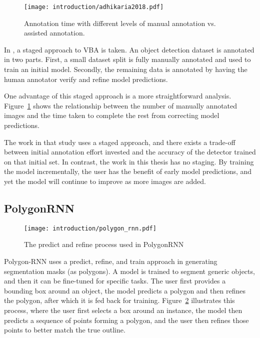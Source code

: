 \begin{figure}[h]
  \centering
  \texttt{[image: introduction/adhikaria2018.pdf]}
  \caption{Annotation time with different levels of manual annotation vs. assisted annotation. \cite{Adhikaria2018}}  
  \label{fig:adhikaria2018}
\end{figure}

In \cite{Adhikaria2018}, a staged approach to \gls{VBA} is taken. An object detection dataset is annotated in two parts. First, a small dataset split is fully manually annotated and used to train an initial model. Secondly, the remaining data is annotated by having the human annotator verify and refine model predictions. 

One advantage of this staged approach is a more straightforward analysis. Figure~\ref{fig:adhikaria2018} shows the relationship between the number of manually annotated images and the time taken to complete the rest from correcting model predictions.

The work in that study uses a staged approach, and there exists a trade-off between initial annotation effort invested and the accuracy of the detector trained on that initial set. In contrast, the work in this thesis has no staging. By training the model incrementally, the user has the benefit of early model predictions, and yet the model will continue to improve as more images are added.

\subsection {PolygonRNN \texorpdfstring{\cite{Castrejon2017}}{}}

\begin{figure}[h]
  \centering
  \texttt{[image: introduction/polygon\_rnn.pdf]}
  \caption{The predict and refine process used in PolygonRNN \cite{Castrejon2017}}  
  \label{fig:polygon_rnn}
\end{figure}


Polygon-RNN \cite{Castrejon2017} uses a predict, refine, and train approach in generating segmentation masks (as polygons). A model is trained to segment generic objects, and then it can be fine-tuned for specific tasks. The user first provides a bounding box around an object, the model predicts a polygon and then refines the polygon,  after which it is fed back for training. Figure~\ref{fig:polygon_rnn} illustrates this process, where the user first selects a box around an instance, the model then predicts a sequence of points forming a polygon, and the user then refines those points to better match the true outline.

